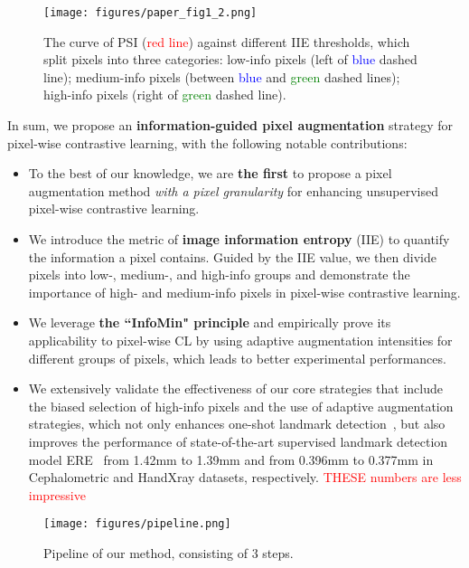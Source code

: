 \documentclass[10pt,twocolumn,letterpaper]{article}
\begin{document}
\begin{figure}
    \centering
    \texttt{[image: figures/paper\_fig1\_2.png]}
    \caption{The curve of PSI (\textcolor{red}{red line}) against different IIE thresholds, which split pixels into three categories: low-info pixels (left of \textcolor{blue}{blue} dashed line); medium-info pixels (between \textcolor{blue}{blue} and \textcolor{green}{green} dashed lines); high-info pixels (right of \textcolor{green}{green} dashed line).}
    \label{fig:psi_ddi}
\end{figure}

In sum, we propose an \textbf{information-guided pixel augmentation} strategy for pixel-wise contrastive learning, with the following notable contributions: 
\begin{itemize}
\item To the best of our knowledge, we are \textbf{the first} to propose a pixel augmentation method \textit{with a pixel granularity} for enhancing unsupervised pixel-wise contrastive learning. 
\item We introduce the metric of {\bf image information entropy} (IIE) to quantify the information a pixel contains. Guided by the IIE value, we then divide pixels into low-, medium-, and high-info groups and demonstrate the importance of high- and medium-info pixels in pixel-wise contrastive learning.
\item We leverage \textbf{the ``InfoMin" principle} and empirically prove its applicability to pixel-wise CL by using adaptive augmentation intensities for different groups of pixels, which leads to better experimental performances.
\item We extensively validate the effectiveness of our core strategies that include the biased selection of high-info pixels and the use of adaptive augmentation strategies, %
which not only enhances one-shot landmark detection~\cite{yao2021one}, but also improves the performance of state-of-the-art supervised landmark detection model ERE~\cite{McCouat_2022_CVPR} from 1.42mm to 1.39mm and from 0.396mm to 0.377mm in Cephalometric and HandXray datasets, respectively. \textcolor{red}{THESE numbers are less impressive}
\end{itemize}

\begin{figure}
    \centering
    \texttt{[image: figures/pipeline.png]}
    \caption{Pipeline of our method, consisting of 3 steps. }
    \label{fig:pipeline}
\end{figure}
\end{document}
